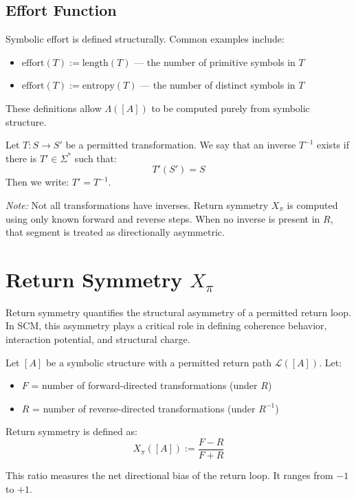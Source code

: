 \subsection{Effort Function} \label{effort-function}

Symbolic effort is defined structurally. Common examples include:
\begin{itemize}
  \item $\text{effort}(T) := \text{length}(T)$ — the number of primitive symbols in $T$
  \item $\text{effort}(T) := \text{entropy}(T)$ — the number of distinct symbols in $T$
\end{itemize}

These definitions allow $\Lambda([A])$ to be computed purely from symbolic structure.

\begin{definition} \label{def:inverse-transformation}
Let $T : S \rightarrow S'$ be a permitted transformation.  
We say that an inverse $T^{-1}$ exists if there is $T' \in \Sigma^*$ such that:
\begin{equation} \label{eq:inverse-transform}
T'(S') = S
\end{equation}
Then we write: $T' = T^{-1}$.
\end{definition}

\textit{Note:} Not all transformations have inverses.  
Return symmetry $X_\pi$ is computed using only known forward and reverse steps.  
When no inverse is present in $R$, that segment is treated as directionally asymmetric.

\section{Return Symmetry $X_\pi$}

Return symmetry quantifies the structural asymmetry of a permitted return loop.  
In SCM, this asymmetry plays a critical role in defining coherence behavior, interaction potential, and structural charge.

\begin{definition} \label{def:return-symmetry}
Let $[A]$ be a symbolic structure with a permitted return path $\mathcal{L}([A])$.  
Let:
\begin{itemize}
  \item $F$ = number of forward-directed transformations (under $R$)
  \item $R$ = number of reverse-directed transformations (under $R^{-1}$)
\end{itemize}

Return symmetry is defined as:
\begin{equation} \label{eq:return-symmetry}
X_\pi([A]) := \frac{F - R}{F + R}
\end{equation}

This ratio measures the net directional bias of the return loop. It ranges from $-1$ to $+1$.
\end{definition}

